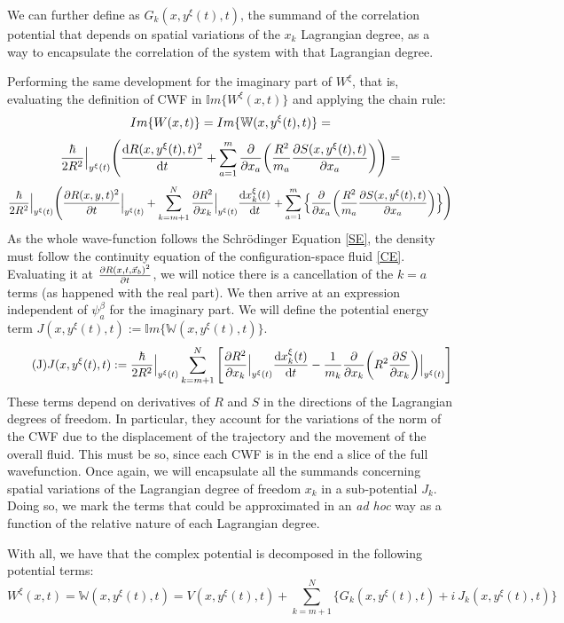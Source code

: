 \documentclass[11pt, a4paper]{article} %
\newcommand{\W}{\mathbb{W}}
\begin{document}
We can further define as $G_k(x,y^\xi(t),t)$, the summand of the correlation potential that depends on spatial variations of the $x_k$ Lagrangian degree, as a way to encapsulate the correlation of the system with that Lagrangian degree.

Performing the same development for the imaginary part of $W^\xi$, that is, evaluating the definition of CWF in $\mathbb{I}m\{W^\xi(x,t)\}$ and applying the chain rule:
$$
Im\{W(x,t)\}=Im\{\W(x, y^\xi(t),t)\}=\vspace{-0.1cm}
$$
$$
\frac{\hbar}{2R^2}\Big\rvert_{y^\xi(t)} \qty( \dv{R(x, y^\xi(t),t)^2}{t} + \sum_{a=1}^m\pdv{}{x_a} \qty(\frac{R^2}{m_a} \pdv{S(x, y^\xi(t),t)}{x_a} ))=\vspace{-0.1cm}
$$
$$
\frac{\hbar}{2R^2}\Big\rvert_{y^\xi(t)} \qty( \pdv{R(x,y,t)^2}{t}\Big\rvert_{y^\xi(t)} + \sum_{k=m+1}^N \pdv{R^2}{x_k}\Big\rvert_{y^\xi(t)} \dv{x_k^\xi(t)}{t} + \sum_{a=1}^m\Big\{\pdv{}{x_a} \qty(\frac{R^2}{m_a} \pdv{S(x, y^\xi(t),t)}{x_a} ) \Big\})
$$
As the whole wave-function follows the Schrödinger Equation \eqref{SE}, the density must follow the continuity equation of the configuration-space fluid \eqref{CE}. Evaluating it at $\pdv{R(x,t, \vec{x}_b)^2}{t}$, we will notice there is a cancellation of the $k=a$ terms (as happened with the real part). We then arrive at an expression independent of $\psi_a^\beta$ for the imaginary part. We will define the potential energy term $J(x, y^\xi(t),t):=\mathbb{I}m\{\W(x, y^\xi(t),t)\}$.
\begin{equation}\label{J}\tag{J}
J(x, y^\xi(t),t):= \frac{\hbar}{2R^2}\Big\rvert_{y^\xi(t)} \sum_{k=m+1}^N \qty[ \pdv{R^2}{x_k}\Big\rvert_{y^\xi(t)} \dv{x_k^\xi(t)}{t} - \frac{1}{m_k} \pdv{}{x_k} \qty(R^2 \pdv{S}{x_k} )\Big\rvert_{y^\xi(t)} ]
\end{equation}
These terms depend on derivatives of $R$ and $S$ in the directions of the Lagrangian degrees of freedom. In particular, they account for the variations of the norm of the CWF due to the displacement of the trajectory and the movement of the overall fluid. This must be so, since each CWF is in the end a slice of the full wavefunction. Once again, we will encapsulate all the summands concerning spatial variations of the Lagrangian degree of freedom $x_k$ in a sub-potential $J_k$. Doing so, we mark the terms that could be approximated in an {\em ad hoc} way as a function of the relative nature of each Lagrangian degree.

With all, we have that the complex potential is decomposed in the following potential terms:
$$
W^\xi(x,t)=\W(x, y^\xi(t),t)= V(x, y^\xi(t),t) + \sum_{k=m+1}^N\Big\{ G_k(x, y^\xi(t),t)+i\ J_k(x, y^\xi(t),t)\Big\}
$$
\end{document}
